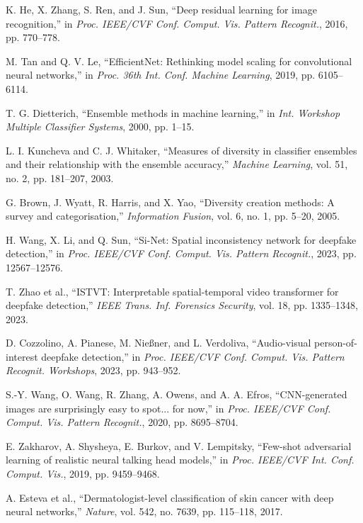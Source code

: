 \documentclass[conference]{IEEEtran}
\begin{document}
\begin{thebibliography}{99}
K. He, X. Zhang, S. Ren, and J. Sun, ``Deep residual learning for image recognition,'' in \textit{Proc. IEEE/CVF Conf. Comput. Vis. Pattern Recognit.}, 2016, pp. 770--778.

M. Tan and Q. V. Le, ``EfficientNet: Rethinking model scaling for convolutional neural networks,'' in \textit{Proc. 36th Int. Conf. Machine Learning}, 2019, pp. 6105--6114.

T. G. Dietterich, ``Ensemble methods in machine learning,'' in \textit{Int. Workshop Multiple Classifier Systems}, 2000, pp. 1--15.

L. I. Kuncheva and C. J. Whitaker, ``Measures of diversity in classifier ensembles and their relationship with the ensemble accuracy,'' \textit{Machine Learning}, vol. 51, no. 2, pp. 181--207, 2003.

G. Brown, J. Wyatt, R. Harris, and X. Yao, ``Diversity creation methods: A survey and categorisation,'' \textit{Information Fusion}, vol. 6, no. 1, pp. 5--20, 2005.

H. Wang, X. Li, and Q. Sun, ``Si-Net: Spatial inconsistency network for deepfake detection,'' in \textit{Proc. IEEE/CVF Conf. Comput. Vis. Pattern Recognit.}, 2023, pp. 12567--12576.

T. Zhao et al., ``ISTVT: Interpretable spatial-temporal video transformer for deepfake detection,'' \textit{IEEE Trans. Inf. Forensics Security}, vol. 18, pp. 1335--1348, 2023.

D. Cozzolino, A. Pianese, M. Nießner, and L. Verdoliva, ``Audio-visual person-of-interest deepfake detection,'' in \textit{Proc. IEEE/CVF Conf. Comput. Vis. Pattern Recognit. Workshops}, 2023, pp. 943--952.

S.-Y. Wang, O. Wang, R. Zhang, A. Owens, and A. A. Efros, ``CNN-generated images are surprisingly easy to spot... for now,'' in \textit{Proc. IEEE/CVF Conf. Comput. Vis. Pattern Recognit.}, 2020, pp. 8695--8704.

E. Zakharov, A. Shysheya, E. Burkov, and V. Lempitsky, ``Few-shot adversarial learning of realistic neural talking head models,'' in \textit{Proc. IEEE/CVF Int. Conf. Comput. Vis.}, 2019, pp. 9459--9468.

A. Esteva et al., ``Dermatologist-level classification of skin cancer with deep neural networks,'' \textit{Nature}, vol. 542, no. 7639, pp. 115--118, 2017.


\end{thebibliography}
\end{document}
